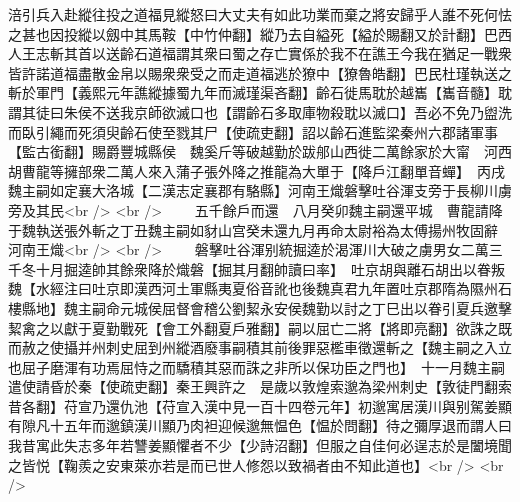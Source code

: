 涪引兵入赴縱往投之道福見縱怒曰大丈夫有如此功業而棄之將安歸乎人誰不死何怯之甚也因投縱以劔中其馬鞍【中竹仲翻】縱乃去自縊死【縊於賜翻又於計翻】巴西人王志斬其首以送齡石道福謂其衆曰蜀之存亡實係於我不在譙王今我在猶足一戰衆皆許諾道福盡散金帛以賜衆衆受之而走道福逃於獠中【獠魯皓翻】巴民杜瑾執送之斬於軍門【義熙元年譙縱據蜀九年而滅瑾渠吝翻】齡石徙馬耽於越巂【巂音髓】耽謂其徒曰朱侯不送我京師欲滅口也【謂齡石多取庫物殺耽以滅口】吾必不免乃盥洗而臥引繩而死須臾齡石使至戮其尸【使疏吏翻】詔以齡石進監梁秦州六郡諸軍事【監古銜翻】賜爵豐城縣侯　魏奚斤等破越勤於跋郍山西徙二萬餘家於大甯　河西胡曹龍等擁部衆二萬人來入蒲子張外降之推龍為大單于【降戶江翻單音蟬】　丙戌魏主嗣如定襄大洛城【二漢志定襄郡有駱縣】河南王熾磐擊吐谷渾支旁于長柳川虜旁及其民<br />
<br />
　　五千餘戶而還　八月癸卯魏主嗣還平城　曹龍請降于魏執送張外斬之丁丑魏主嗣如豺山宫癸未還九月再命太尉裕為太傅揚州牧固辭　河南王熾<br />
<br />
　　磐擊吐谷渾别統掘逵於渴渾川大破之虜男女二萬三千冬十月掘逵帥其餘衆降於熾磐【掘其月翻帥讀曰率】　吐京胡與離石胡出以眷叛魏【水經注曰吐京即漢西河土軍縣夷夏俗音訛也後魏真君九年置吐京郡隋為隰州石樓縣地】魏主嗣命元城侯屈督會稽公劉絜永安侯魏勤以討之丁巳出以眷引夏兵邀擊絜禽之以獻于夏勤戰死【會工外翻夏戶雅翻】嗣以屈亡二將【將即亮翻】欲誅之既而赦之使攝并州刺史屈到州縱酒廢事嗣積其前後罪惡檻車徵還斬之【魏主嗣之入立也屈子磨渾有功焉屈恃之而驕積其惡而誅之非所以保功臣之門也】　十一月魏主嗣遣使請昏於秦【使疏吏翻】秦王興許之　是歲以敦煌索邈為梁州刺史【敦徒門翻索昔各翻】苻宣乃還仇池【苻宣入漢中見一百十四卷元年】初邈寓居漢川與别駕姜顯有隙凡十五年而邈鎮漢川顯乃肉袒迎候邈無愠色【愠於問翻】待之彌厚退而謂人曰我昔寓此失志多年若讐姜顯懼者不少【少詩沼翻】但服之自佳何必逞志於是闔境聞之皆悦【鞠羨之安東萊亦若是而已世人修怨以致禍者由不知此道也】<br />
<br />
